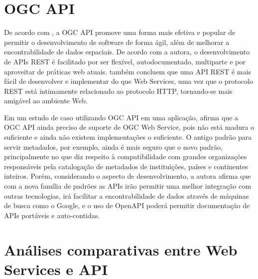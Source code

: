 \section{OGC API}


De acordo com \cite{simoes2022datos}, a OGC API promove uma forma mais efetiva e popular de permitir o desenvolvimento de software de forma ágil, além de melhorar a encontrabilidade de dados espaciais. De acordo com a autora, o desenvolvimento de APIs REST é facilitado por ser flexível, autodocumentado, multiparte e por aproveitar de práticas web atuais. \cite{aihkisalo2012latencies} também concluem que uma API REST é mais fácil de desenvolver e implementar do que Web Services, uma vez que o protocolo REST está intimamente relacionado ao protocolo HTTP, tornando-se mais amigável ao ambiente Web.

Em um estudo de caso utilizando OGC API em uma aplicação, \cite{simoes2022serving} afirma que a OGC API ainda preciso de suporte de OGC Web Service, pois não está madura o suficiente e ainda não existem implementações o suficiente. O antigo padrão para servir metadados, por exemplo, ainda é mais seguro que o novo padrão, principalmente no que diz respeito à compatibilidade com grandes organizações responsáveis pela catalogação de metadados de instituições, países e continentes inteiros. Porém, considerando o aspecto de desenvolvimento, a autora afirma que com a nova família de padrões as APIs irão permitir uma melhor integração com outras tecnologias, irá facilitar a encontrabilidade de dados através de máquinas de busca como o Google, e o uso de OpenAPI poderá permitir documentação de APIs portáveis e auto-contidas.



\section{Análises comparativas entre Web Services e API}
  
